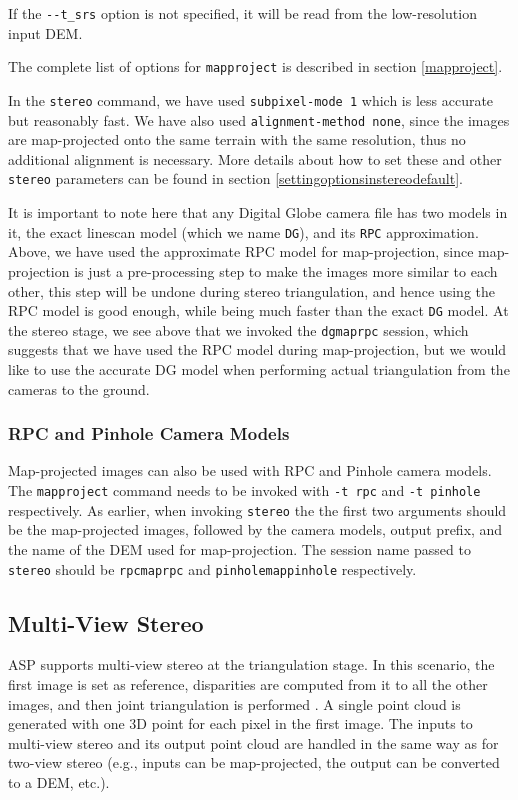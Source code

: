 If the \texttt{-\/-t\_srs} option is not specified, it will be read from
the low-resolution input DEM.

The complete list of options for \texttt{mapproject} is described in
section \ref{mapproject}.

In the \texttt{stereo} command, we have used \texttt{subpixel-mode 1}
which is less accurate but reasonably fast. We have also used
\texttt{alignment-method none}, since the images are map-projected onto
the same terrain with the same resolution, thus no additional alignment
is necessary. More details about how to set these and other
\texttt{stereo} parameters can be found in section
\ref{settingoptionsinstereodefault}.

It is important to note here that any Digital Globe camera file has two
models in it, the exact linescan model (which we name \texttt{DG}), and
its \texttt{RPC} approximation. Above, we have used the approximate RPC
model for map-projection, since map-projection is just a pre-processing
step to make the images more similar to each other, this step will be
undone during stereo triangulation, and hence using the RPC model is
good enough, while being much faster than the exact \texttt{DG}
model. At the stereo stage, we see above that we invoked the
\texttt{dgmaprpc} session, which suggests that we have used the RPC
model during map-projection, but we would like to use the accurate DG
model when performing actual triangulation from the cameras to the
ground.

\subsubsection{RPC and Pinhole Camera Models}

Map-projected images can also be used with RPC and Pinhole camera
models. The \texttt{mapproject} command needs to be invoked with
\texttt{-t rpc} and \texttt{-t pinhole} respectively. As earlier, when
invoking \texttt{stereo} the the first two arguments should be the
map-projected images, followed by the camera models, output prefix, and
the name of the DEM used for map-projection. The session name passed to
\texttt{stereo} should be \texttt{rpcmaprpc} and
\texttt{pinholemappinhole} respectively.

\subsection{Multi-View Stereo}
\label{multiview}

ASP supports multi-view stereo at the triangulation stage.  In this
scenario, the first image is set as reference, disparities are
computed from it to all the other images, and then joint triangulation
is performed \cite{slabaugh2001optimal}. A single
point cloud is generated with one 3D point for each pixel in the first
image. The inputs to multi-view stereo and its output point cloud are
handled in the same way as for two-view stereo (e.g., inputs can be
map-projected, the output can be converted to a DEM, etc.).

